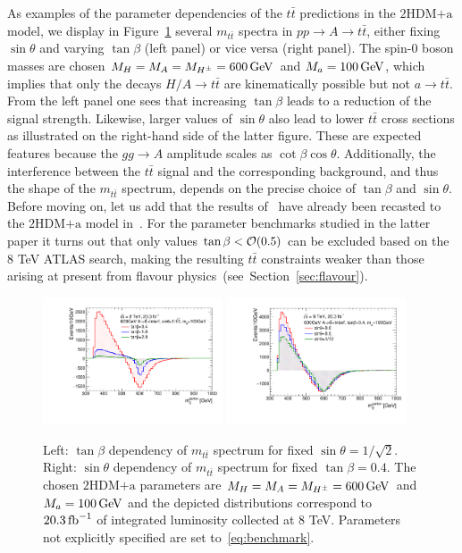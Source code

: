 \documentclass[a4paper, 11pt,notoc]{article}
\newcommand{\mA}{\ensuremath{M_{A}}\xspace}
\newcommand{\ma}{\ensuremath{M_{a}}\xspace}
\newcommand{\mH}{\ensuremath{M_{H}}\xspace}
\newcommand{\mHc}{\ensuremath{M_{H^{\pm}}}\xspace}
\newcommand{\hdma}{\ensuremath{\textrm{2HDM+a}}\xspace}
\begin{document}
As examples of the parameter dependencies of the $t \bar t$ predictions in the \hdma model, we display in  Figure~\ref{fig:ttres_2HDM_A} several $m_{t \bar t}$ spectra in $pp \to A \to t \bar t$, either fixing $\sin \theta$ and varying $\tan \beta$ (left panel) or vice versa (right panel). The  spin-0 boson  masses are chosen $\mH=\mA=\mHc =600 \, {\rm GeV}$ and $\ma=100 \, {\rm GeV}$, which implies that only the  decays $H/A \to t \bar t$  are kinematically possible but not $a \to t \bar t$.  From the left panel one sees that increasing $\tan \beta$ leads  to a reduction of the signal strength.  Likewise, larger values of $\sin \theta$ also lead to lower $t \bar t$ cross sections as illustrated on the right-hand side of the latter figure. These are expected features because the $g g \to A$ amplitude  scales as $\cot \beta \cos \theta$.  Additionally, the interference between the $t \bar t$ signal and the corresponding background, and thus the shape of the $m_{t \bar t}$ spectrum, depends on the precise choice of $\tan \beta$  and $\sin \theta$.  Before moving on, let us add that the results of~\cite{Aaboud:2017hnm} have already been recasted to the \hdma model in~\cite{Bauer:2017ota}. For the parameter benchmarks studied in the latter paper it turns out that only values $\tan \beta < {\cal O} ( 0.5)$ can be excluded based on the 8 TeV ATLAS search, making the resulting $t \bar t$ constraints weaker than those arising at present from flavour physics~(see~Section~\ref{sec:flavour}). 

\begin{figure}
\centering
\includegraphics[width=0.475\textwidth]{ttres_2HDMa_A_tanb.pdf} \quad 
\includegraphics[width=0.475\textwidth]{ttres_2HDMa_A_sinp.pdf}
\vspace{4mm}
\caption{Left: $\tan \beta$ dependency of $m_{t \bar t}$ spectrum for fixed $\sin \theta = 1/\sqrt{2}$. Right:  $\sin \theta$ dependency of $m_{t \bar t}$ spectrum for fixed $\tan \beta = 0.4$. The chosen \hdma parameters are $\mH=\mA=\mHc =600 \, {\rm GeV}$ and $\ma=100 \, {\rm GeV}$ and the depicted distributions correspond to $20.3 \, {\rm fb}^{-1}$ of integrated luminosity collected at 8 TeV. Parameters not explicitly specified are set to~\eqref{eq:benchmark}.}
\label{fig:ttres_2HDM_A}
\end{figure}
\end{document}
